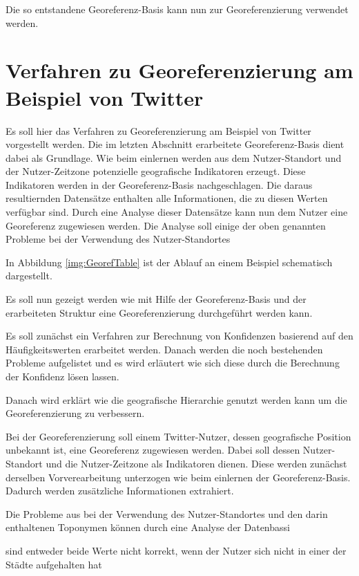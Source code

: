 			Die so entstandene Georeferenz-Basis kann nun zur Georeferenzierung verwendet werden. 

	\section{Verfahren zu Georeferenzierung am Beispiel von Twitter}

		Es soll hier das Verfahren zu Georeferenzierung am Beispiel von Twitter vorgestellt werden.
		Die im letzten Abschnitt erarbeitete Georeferenz-Basis dient dabei als Grundlage.
		Wie beim einlernen werden aus dem Nutzer-Standort und der Nutzer-Zeitzone potenzielle geografische Indikatoren erzeugt.
		Diese Indikatoren werden in der Georeferenz-Basis nachgeschlagen.
		Die daraus resultiernden Datensätze enthalten alle Informationen, die zu diesen Werten verfügbar sind.
		Durch eine Analyse dieser Datensätze kann nun dem Nutzer eine Georeferenz zugewiesen werden.
		Die Analyse soll einige der oben genannten Probleme bei der Verwendung des Nutzer-Standortes

		In Abbildung \ref{img:GeorefTable} ist der Ablauf an einem Beispiel schematisch dargestellt.  

		Es soll nun gezeigt werden wie mit Hilfe der Georeferenz-Basis und der erarbeiteten Struktur eine Georeferenzierung durchgeführt werden kann.

		Es soll zunächst ein Verfahren zur Berechnung von Konfidenzen basierend auf den Häufigkeitswerten erarbeitet werden. 
		Danach werden die noch bestehenden Probleme aufgelistet und es wird erläutert wie sich diese durch die Berechnung der Konfidenz lösen lassen. 

		Danach wird erklärt wie die geografische Hierarchie genutzt werden kann um die Georeferenzierung zu verbessern.


		Bei der Georeferenzierung soll einem Twitter-Nutzer, dessen geografische Position unbekannt ist, eine Georeferenz zugewiesen werden.
		Dabei soll dessen Nutzer-Standort und die Nutzer-Zeitzone als Indikatoren dienen. 
		Diese werden zunächst derselben Vorverearbeitung unterzogen wie beim einlernen der Georeferenz-Basis.
		Dadurch werden zusätzliche Informationen extrahiert.


		Die Probleme aus bei der Verwendung des Nutzer-Standortes und den darin enthaltenen Toponymen können durch eine Analyse der Datenbassi 



				 sind entweder beide Werte nicht korrekt, wenn der Nutzer sich nicht in einer der Städte aufgehalten hat




